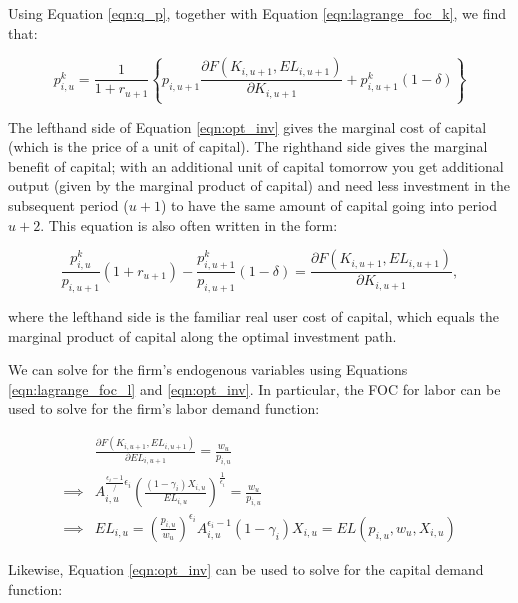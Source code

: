 \documentclass[letterpaper,12pt]{article}
\theoremstyle{definition}
\begin{document}
\begin{spacing}{1.5}
Using Equation \ref{eqn:q_p}, together with Equation \ref{eqn:lagrange_foc_k}, we find that:

\begin{equation}
\label{eqn:opt_inv}
p^{k}_{i,u} =  \frac{1}{1+r_{u+1}} \left\{p_{i,u+1}\frac{\partial F(K_{i,u+1},EL_{i,u+1})}{\partial K_{i,u+1}}+ p^{k}_{i,u+1}(1-\delta)  \right\} 
\end{equation}

The lefthand side of Equation \ref{eqn:opt_inv} gives the marginal cost of capital (which is the price of a unit of capital).  The righthand side gives the marginal benefit of capital; with an additional unit of capital tomorrow you get additional output (given by the marginal product of capital) and need less investment in the subsequent period ($u+1$) to have the same amount of capital going into period $u+2$.  This equation is also often written in the form:

\begin{equation}
\label{eqn:opt_inv2}
\frac{p^{k}_{i,u}}{p_{i,u+1}}(1+r_{u+1}) - \frac{p^{k}_{i,u+1}}{p_{i,u+1}}(1-\delta) =\frac{\partial F(K_{i,u+1},EL_{i,u+1})}{\partial K_{i,u+1}} , 
\end{equation}

\noindent\noindent where the lefthand side is the familiar real user cost of capital, which equals the marginal product of capital along the optimal investment path.

We can solve for the firm's endogenous variables using Equations \ref{eqn:lagrange_foc_l} and \ref{eqn:opt_inv}.  In particular, the FOC for labor can be used to solve for the firm's labor demand function:

\begin{equation}
\label{eqn:solve_dyn_l}
\begin{split}
 &\frac{\partial F(K_{i,u+1},EL_{i,u+1})}{\partial EL_{i,u+1}} =  \frac{w_{u}}{ p_{i,u}}  \\
 \implies & A_{i,u}^{\frac{\epsilon_{i}-1}/{\epsilon_{i}}}\left( \frac{(1-\gamma_{i})X_{i,u}}{EL_{i,u}}\right)^{\frac{1}{\epsilon_{i}}} =   \frac{w_{u}}{ p_{i,u}} \\
\implies & EL_{i,u} = \left( \frac{ p_{i,u}}{w_{u}}\right)^{\epsilon_{i}}A_{i,u}^{\epsilon_{i}-1}(1-\gamma_{i})X_{i,u} = EL(p_{i,u},w_{u},X_{i,u})
\end{split}
\end{equation}

Likewise, Equation \ref{eqn:opt_inv} can be used to solve for the capital demand function:


\end{spacing}
\end{document}

